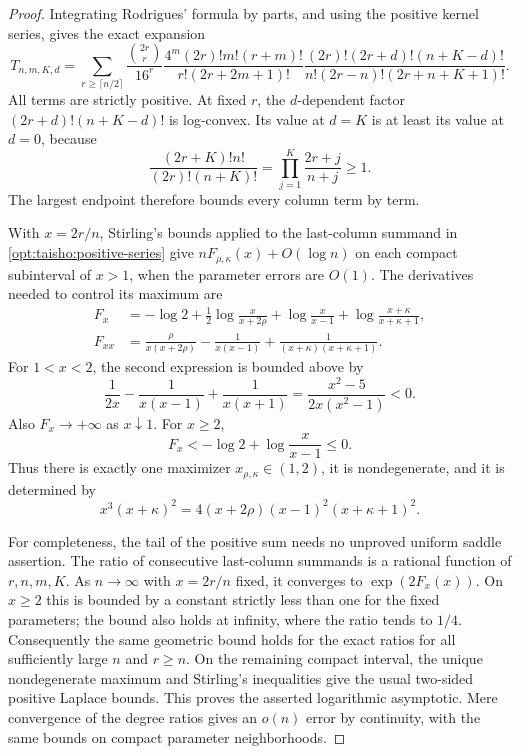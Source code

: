 \documentclass[11pt,a4paper]{article}
\numberwithin{equation}{section}
\theoremstyle{definition}\newtheorem{definition}[theorem]{Definition}
\theoremstyle{remark}\newtheorem{remark}[theorem]{Remark}
\begin{document}
\begin{proof}
Integrating Rodrigues' formula by parts, and using the positive kernel
series, gives the exact expansion
\begin{equation}\label{opt:taisho:positive-series}
 T_{n,m,K,d}=
 \sum_{r\ge\lceil n/2\rceil}
 \frac{\binom{2r}{r}}{16^r}
 \frac{4^m(2r)!m!(r+m)!}{r!(2r+2m+1)!}
 \frac{(2r)!(2r+d)!(n+K-d)!}
      {n!(2r-n)!(2r+n+K+1)!}.
\end{equation}
All terms are strictly positive. At fixed $r$, the $d$-dependent factor
$(2r+d)!(n+K-d)!$ is log-convex. Its value at $d=K$ is at least its value
at $d=0$, because
\[
 \frac{(2r+K)!n!}{(2r)!(n+K)!}
       =\prod_{j=1}^K\frac{2r+j}{n+j}\ge1.
\]
The largest endpoint therefore bounds every column term by term.

With $x=2r/n$, Stirling's bounds applied to the last-column summand in
\eqref{opt:taisho:positive-series} give $nF_{\rho,\kappa}(x)+O(\log n)$
on each compact subinterval of $x>1$, when the parameter errors are
$O(1)$. The derivatives needed to control its maximum are
\begin{align*}
 F_x&=-\log2+\frac12\log\frac{x}{x+2\rho}
             +\log\frac{x}{x-1}+\log\frac{x+\kappa}{x+\kappa+1},\\
 F_{xx}&=\frac{\rho}{x(x+2\rho)}
       -\frac1{x(x-1)}+
        \frac1{(x+\kappa)(x+\kappa+1)}.
\end{align*}
For $1<x<2$, the second expression is bounded above by
\[
 \frac1{2x}-\frac1{x(x-1)}+\frac1{x(x+1)}
              =\frac{x^2-5}{2x(x^2-1)}<0.
\]
Also $F_x\to+\infty$ as $x\downarrow1$. For $x\ge2$,
\[
 F_x< -\log2+\log\frac{x}{x-1}\le0.
\]
Thus there is exactly one maximizer $x_{\rho,\kappa}\in(1,2)$,
it is nondegenerate, and it is determined by
\begin{equation}\label{opt:taisho:saddle}
 x^3(x+\kappa)^2
   =4(x+2\rho)(x-1)^2(x+\kappa+1)^2.
\end{equation}

For completeness, the tail of the positive sum needs no unproved uniform
saddle assertion. The ratio of consecutive last-column summands is a
rational function of $r,n,m,K$. As $n\to\infty$ with $x=2r/n$ fixed,
it converges to $\exp(2F_x(x))$. On $x\ge2$ this is bounded by a constant
strictly less than one for the fixed parameters; the bound also holds at
infinity, where the ratio tends to $1/4$. Consequently the same geometric
bound holds for the exact ratios for all sufficiently large $n$ and
$r\ge n$. On the remaining compact interval, the unique nondegenerate
maximum and Stirling's inequalities give the usual two-sided positive
Laplace bounds. This proves the asserted logarithmic asymptotic. Mere
convergence of the degree ratios gives an $o(n)$ error by continuity,
with the same bounds on compact parameter neighborhoods.


\end{proof}
\end{document}
